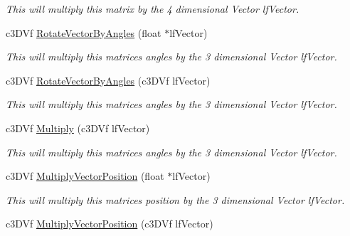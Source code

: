 \begin{DoxyCompactItemize}
\begin{DoxyCompactList}\small\item\em This will multiply this matrix by the 4 dimensional Vector lfVector. \end{DoxyCompactList}\item 
\hypertarget{classc_matrix4_a95d71e1823bbca3ddd9834e2d9af1b46}{
c3DVf \hyperlink{classc_matrix4_a95d71e1823bbca3ddd9834e2d9af1b46}{RotateVectorByAngles} (float $\ast$lfVector)}
\label{classc_matrix4_a95d71e1823bbca3ddd9834e2d9af1b46}

\begin{DoxyCompactList}\small\item\em This will multiply this matrices angles by the 3 dimensional Vector lfVector. \end{DoxyCompactList}\item 
\hypertarget{classc_matrix4_abd6f4049cde35ad7b72d395762c17c0f}{
c3DVf \hyperlink{classc_matrix4_abd6f4049cde35ad7b72d395762c17c0f}{RotateVectorByAngles} (c3DVf lfVector)}
\label{classc_matrix4_abd6f4049cde35ad7b72d395762c17c0f}

\begin{DoxyCompactList}\small\item\em This will multiply this matrices angles by the 3 dimensional Vector lfVector. \end{DoxyCompactList}\item 
\hypertarget{classc_matrix4_a832568da5c48ddd89b5f6feb99f3c528}{
c3DVf \hyperlink{classc_matrix4_a832568da5c48ddd89b5f6feb99f3c528}{Multiply} (c3DVf lfVector)}
\label{classc_matrix4_a832568da5c48ddd89b5f6feb99f3c528}

\begin{DoxyCompactList}\small\item\em This will multiply this matrices angles by the 3 dimensional Vector lfVector. \end{DoxyCompactList}\item 
\hypertarget{classc_matrix4_a011321db92a3b461c46fdbf96e16fe7b}{
c3DVf \hyperlink{classc_matrix4_a011321db92a3b461c46fdbf96e16fe7b}{MultiplyVectorPosition} (float $\ast$lfVector)}
\label{classc_matrix4_a011321db92a3b461c46fdbf96e16fe7b}

\begin{DoxyCompactList}\small\item\em This will multiply this matrices position by the 3 dimensional Vector lfVector. \end{DoxyCompactList}\item 
\hypertarget{classc_matrix4_a802eff4e68910ce08624ec1a9c3258ad}{
c3DVf \hyperlink{classc_matrix4_a802eff4e68910ce08624ec1a9c3258ad}{MultiplyVectorPosition} (c3DVf lfVector)}
\label{classc_matrix4_a802eff4e68910ce08624ec1a9c3258ad}


\end{DoxyCompactItemize}
